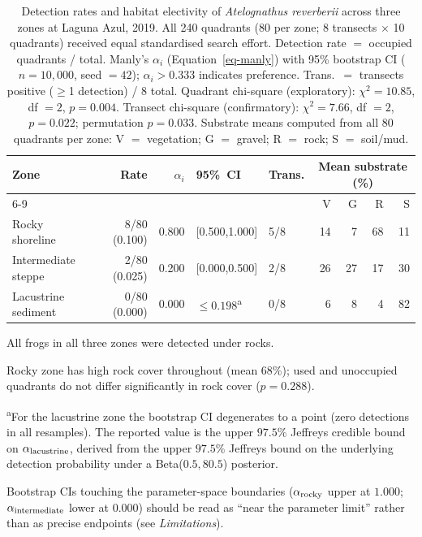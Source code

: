 \begin{table}[H]
\centering
\caption{\label{tab-zones}Detection rates and habitat electivity of \textit{Atelognathus
reverberii} across three zones at Laguna Azul, 2019. All 240 quadrants
(80 per zone; 8 transects $\times$ 10 quadrants) received equal
standardised search effort. Detection rate $=$ occupied quadrants / total.
Manly's $\alpha_i$ (Equation~\ref{eq-manly}) with 95\% bootstrap CI
($n = 10{,}000$, seed $= 42$); $\alpha_i > 0.333$ indicates preference.
Trans.\ $=$ transects positive ($\geq$1 detection) / 8 total.
Quadrant chi-square (exploratory): $\chi^2 = 10.85$,
df $= 2$, $p = 0.004$.
Transect chi-square (confirmatory): $\chi^2 = 7.66$,
df $= 2$, $p = 0.022$;
permutation $p = 0.033$.
Substrate means computed from all 80 quadrants per zone:
V $=$ vegetation; G $=$ gravel; R $=$ rock; S $=$ soil/mud.}
\begin{threeparttable}
\begin{tabular}{lrrllrrrr}
\toprule
Zone & Rate & $\alpha_i$ & 95\%~CI & Trans. &
\multicolumn{4}{c}{Mean substrate (\%)} \\
\cmidrule(lr){6-9}
 & & & & & V & G & R & S \\
\midrule
Rocky shoreline   & 8/80 (0.100) &
  0.800 &
  [0.500,1.000] & 5/8 &
  14 &  7 & 68 & 11 \\
Intermediate steppe & 2/80 (0.025) &
  0.200 &
  [0.000,0.500] & 2/8 &
  26 & 27 & 17 & 30 \\
Lacustrine sediment & 0/80 (0.000) &
  0.000 & $\leq 0.198$\textsuperscript{a} &
  0/8 &  6 &  8 &  4 & 82 \\
\bottomrule
\end{tabular}
\begin{tablenotes}[flushleft]\footnotesize
  \item All frogs in all three zones were detected under rocks.
  \item Rocky zone has high rock cover throughout (mean 68\%); used and
    unoccupied quadrants do not differ significantly in rock cover
    ($p = 0.288$).
  \item \textsuperscript{a}For the lacustrine zone the bootstrap CI degenerates
    to a point (zero detections in all resamples). The reported value is the
    upper $97.5\%$ Jeffreys credible bound on $\alpha_{\rm lacustrine}$,
    derived from the upper $97.5\%$ Jeffreys bound on the underlying
    detection probability under a Beta($0.5,80.5$) posterior.
  \item Bootstrap CIs touching the parameter-space boundaries
    ($\alpha_{\rm rocky}$ upper at $1.000$; $\alpha_{\rm intermediate}$
    lower at $0.000$) should be read as ``near the parameter limit'' rather
    than as precise endpoints (see \textit{Limitations}).
\end{tablenotes}
\end{threeparttable}
\end{table}

